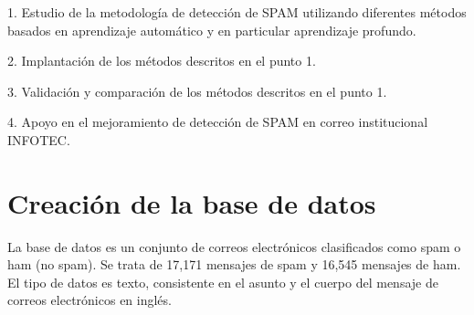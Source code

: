 1. Estudio de la metodología de detección de SPAM utilizando diferentes métodos basados en aprendizaje automático y en particular aprendizaje profundo.

2. Implantación de los métodos descritos en el punto 1.

3. Validación y comparación de los métodos descritos en el punto 1.

4. Apoyo en el mejoramiento de detección de SPAM en correo institucional INFOTEC.
\section{Creación de la base de datos}
La base de datos es un conjunto de correos electrónicos clasificados como spam o ham (no spam). Se trata de 17,171 mensajes de spam y 16,545 mensajes de ham. El tipo de datos es texto, consistente en el asunto y el cuerpo del mensaje de correos electrónicos en inglés.
